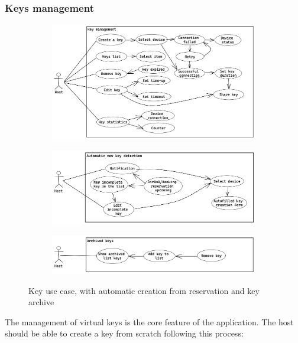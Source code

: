 \subsubsection{Keys management}
\begin{figure}[H]
    \centering
    \begin{subfigure}[b]{\textwidth}
        \includegraphics[width=\textwidth]{figures/keys.excalidraw.png}
    \end{subfigure}
    \begin{subfigure}[b]{\textwidth}
        \includegraphics[width=\textwidth]{figures/autokey.excalidraw.png}
    \end{subfigure}
    \begin{subfigure}[b]{\textwidth}
        \includegraphics[width=\textwidth]{figures/keylist.excalidraw.png}
    \end{subfigure}
    \caption{Key use case, with automatic creation from reservation and key archive}
    \label{fig:keyusecases}
\end{figure}
The management of virtual keys is the core feature of the application. The host should be able to create a key from scratch following this process:
